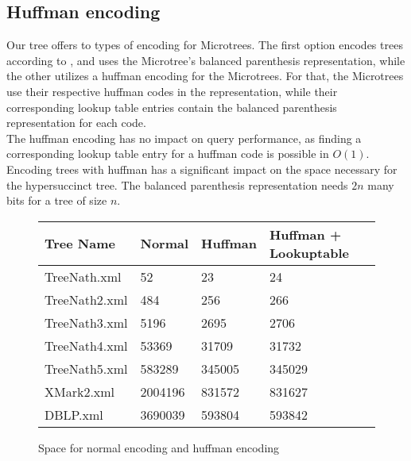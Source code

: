 \documentclass{article}
\begin{document}
\subsection{Huffman encoding}
Our tree offers to types of encoding for Microtrees. The first option encodes trees according to \cite{farzanMunro}, and uses the Microtree's balanced parenthesis representation, while the other utilizes a huffman encoding for the Microtrees. For that, the Microtrees use their respective huffman codes in the representation, while their corresponding lookup table entries contain the balanced parenthesis representation for each code.\\
The huffman encoding has no impact on query performance, as finding a corresponding lookup table entry for a huffman code is possible in $O(1)$. Encoding trees with huffman has a significant impact on the space necessary for the hypersuccinct tree. The balanced parenthesis representation needs $2n$ many bits for a tree of size $n$.\\
\begin{figure}[h]
	\begin{tabular}{ |p{3cm}||p{2cm}|p{2cm}|p{4cm}|  }
		 \hline
		 Tree Name & Normal &Huffman &Huffman + Lookuptable\\
		 \hline
		 TreeNath.xml   & 52    & 23 &   24 \\
		 TreeNath2.xml&   484  & 256   & 266 \\
		 TreeNath3.xml&5196 &2695&  2706\\
		 TreeNath4.xml&53369& 31709&  31732\\
		 TreeNath5.xml&583289&345005&345029\\
		 XMark2.xml&2004196&831572&831627\\
		 DBLP.xml&3690039&593804&593842\\
		 \hline
	\end{tabular}
\caption{Space for normal encoding and huffman encoding}
\label{huff:table1}
\end{figure}
\end{document}
